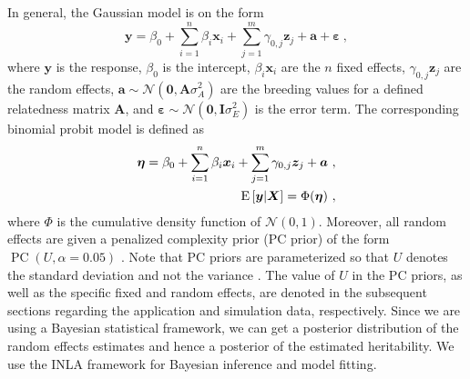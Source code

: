 In general, the Gaussian model is on the form
\begin{equation}
    \bm y = \beta_0 + \sum_{i=1}^n \beta_i \bm x_{i} + \sum_{j=1}^m \gamma_{0,j} \bm z_{j} + \bm a + \bm\varepsilon \ ,
    \label{eq:method:general gaussian model}
\end{equation}
where $\bm y$ is the response, $\beta_0$ is the intercept, $\beta_i \bm x_i$ are the $n$ fixed effects, $\gamma_{0,j}\bm z_j$ are the random effects, $\bm a \sim \mathcal N(\bm 0, \bm A \sigma^2_A)$ are the breeding values for a defined relatedness matrix $\bm A$, and $\bm\varepsilon \sim \mathcal N(\bm 0, \bm I \sigma^2_E)$ is the error term. The corresponding binomial probit model is defined as
\begin{align}
    \label{eq:method:general probit model}
    \bm \eta = \beta_0 + \sum_{i=1}^n \beta_i \bm x_{i} + \sum_{j=1}^m \gamma_{0,j} \bm z_{j} + \bm a \ , \\
    \operatorname{E}\left[\bm y | \bm X\right] = \Phi(\bm \eta) \ ,
\end{align}
where $\Phi$ is the cumulative density function of $\mathcal N(0,1)$. Moreover, all random effects are given a penalized complexity prior (PC prior) of the form $\operatorname{PC}(U, \alpha=0.05)$ \autocite{simpson-pcpriors}. Note that PC priors are parameterized so that $U$ denotes the standard deviation and not the variance \autocite{inla2009}. The value of $U$ in the PC priors, as well as the specific fixed and random effects, are denoted in the subsequent sections regarding the application and simulation data, respectively.
Since we are using a Bayesian statistical framework, we can get a posterior distribution of the random effects estimates and hence a posterior of the estimated heritability. We use the INLA framework \autocite{inla2009} for Bayesian inference and model fitting.

